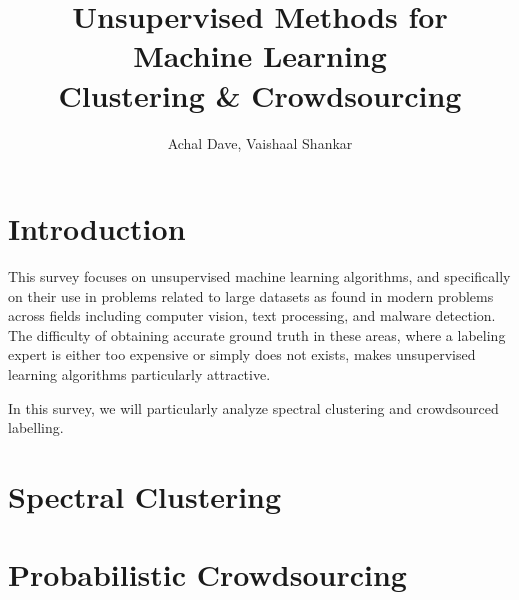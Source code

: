 \documentclass{article}
\title{Unsupervised Methods for Machine Learning \\
\large Clustering \& Crowdsourcing}
\author{Achal Dave, Vaishaal Shankar}
\date{}
\begin{document}
\maketitle
\tableofcontents
\clearpage


\section{Introduction}

This survey focuses on unsupervised machine learning algorithms, and
specifically on their use in problems related to large datasets as found in
modern problems across fields including computer vision, text processing, and
malware detection. The difficulty of obtaining accurate ground truth in these
areas, where a labeling expert is either too expensive or simply does not exists,
makes unsupervised learning algorithms particularly attractive.

In this survey, we will particularly analyze spectral clustering and
crowdsourced labelling.

\section{Spectral Clustering}


\newpage

\section{Probabilistic Crowdsourcing}




\end{document}
